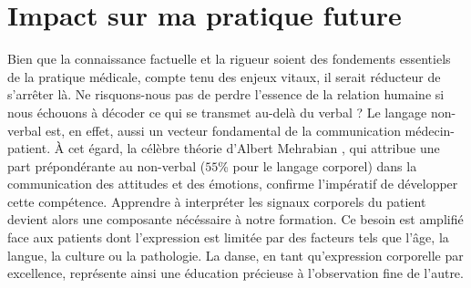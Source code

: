 \section{Impact sur ma pratique future}

Bien que la connaissance factuelle et la rigueur soient des fondements essentiels de la pratique médicale, compte tenu des enjeux vitaux, il serait réducteur de s'arrêter là. Ne risquons-nous pas de perdre l'essence de la relation humaine si nous échouons à décoder ce qui se transmet au-delà du verbal ? Le langage non-verbal est, en effet, aussi un vecteur fondamental de la communication médecin-patient. À cet égard, la célèbre théorie d'Albert Mehrabian \parencite{demetersante2022}, qui attribue une part prépondérante au non-verbal ($55$\% pour le langage corporel) dans la communication des attitudes et des émotions, confirme l'impératif de développer cette compétence. Apprendre à interpréter les signaux corporels du patient devient alors une composante nécéssaire à notre formation. Ce besoin est amplifié face aux patients dont l'expression est limitée par des facteurs tels que l'âge, la langue, la culture ou la pathologie. La danse, en tant qu'expression corporelle par excellence, représente ainsi une éducation précieuse à l'observation fine de l'autre.\\

